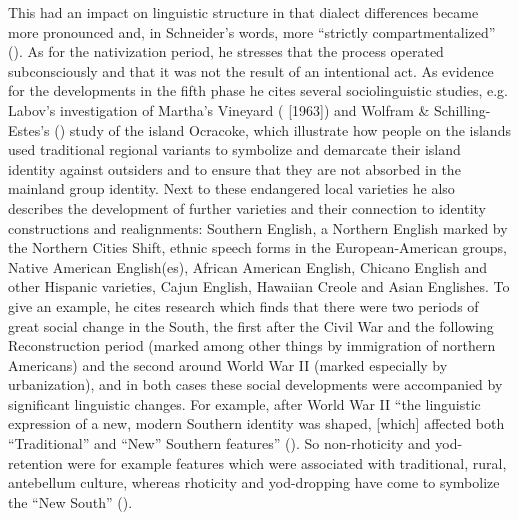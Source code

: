 This had an impact on linguistic structure in that dialect differences became more pronounced and, in Schneider’s words, more “strictly compartmentalized” (\citeyear[296]{Schneider2007}). As for the nativization period, he stresses that the process operated subconsciously and that it was not the result of an intentional act. As evidence for the developments in the fifth phase he cites several sociolinguistic studies, e.g. Labov’s investigation of Martha’s Vineyard (\citealt{Labov1972} [1963]) and Wolfram \& Schilling-Estes's (\citeyear{Wolfram1996,Wolfram1997}) study of the island Ocracoke, which illustrate how people on the islands used traditional regional variants to symbolize and demarcate their island identity against outsiders and to ensure that they are not absorbed in the mainland group identity. Next to these endangered local varieties he also describes the development of further varieties and their connection to identity constructions and realignments: Southern English, a Northern English marked by the Northern Cities Shift, ethnic speech forms in the European-American groups, Native American English(es), African American English, Chicano English and other Hispanic varieties, Cajun English, Hawaiian Creole and Asian Englishes. To give an example, he cites  research which finds that there were two periods of great social change in the South, the first after the Civil War and the following Reconstruction period (marked among other things by immigration of northern Americans) and the second around World War II (marked especially by urbanization), and in both cases these social developments were accompanied by significant linguistic changes. For example, after World War II “the linguistic expression of a new, modern Southern identity was shaped, [which] affected both “Traditional” and “New” Southern features” (\citeyear[299]{Schneider2007}). So non-rhoticity and yod-retention were for example features which were associated with traditional, rural, antebellum culture, whereas rhoticity and yod-dropping have come to symbolize the “New South” (\citeyear[299]{Schneider2007}).


